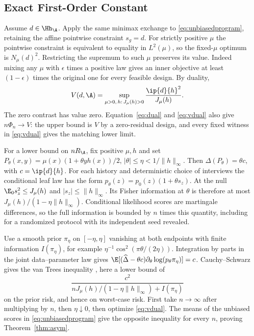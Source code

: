 \subsection{Exact First-Order Constant}
Assume $d\in\Hh_\A$. Apply the same minimax exchange to \eqref{eq:unbiasedprogram}, retaining the affine pointwise constraint $s_g=d$. For strictly positive $\mu$ the pointwise constraint is equivalent to equality in $L^2(\mu)$, so the fixed-$\mu$ optimum is $N_\mu(d)^2$. Restricting the supremum to such $\mu$ preserves its value. Indeed mixing any $\mu$ with $\epsilon$ times a positive law gives an inner objective at least $(1-\epsilon)$ times the original one for every feasible design. By duality,
\begin{equation}
 V(d,\A)=\sup_{\mu>0,\,h:\,J_\mu(h)>0}
                \frac{\ip{d}{h}^2}{J_\mu(h)}.\label{eq:vdual}
\end{equation}
The zero contrast has value zero. Equation~\eqref{eq:dual} and \eqref{eq:vdual} also give $n\Phi_n\to V$: the upper bound is $V$ by a zero-residual design, and every fixed witness in \eqref{eq:vdual} gives the matching lower limit.

For a lower bound on $nR_\A$, fix positive $\mu,h$ and set $P_\theta(x,y)=\mu(x)(1+\theta y h(x))/2$, $|\theta|\le\eta<1/\|h\|_\infty$. Then $\Delta(P_\theta)=\theta c$, with $c=\ip{d}{h}$. For each history and deterministic choice of interviews the conditional leaf law has the form $p_\theta(z)=p_0(z)(1+\theta s_z)$. At the null $\E_0s_z^2\le J_\mu(h)$ and $|s_z|\le\|h\|_\infty$. Its Fisher information at $\theta$ is therefore at most $J_\mu(h)/(1-\eta\|h\|_\infty)$. Conditional likelihood scores are martingale differences, so the full information is bounded by $n$ times this quantity, including for a randomized protocol with its independent seed revealed.

Use a smooth prior $\pi_\eta$ on $[-\eta,\eta]$ vanishing at both endpoints with finite information $I(\pi_\eta)$, for example $\eta^{-1}\cos^2(\pi \theta/(2\eta))$. Integration by parts in the joint data--parameter law gives $\E[(\widehat\Delta-\theta c)\partial_\theta\log(p_\theta\pi_\eta)]=c$. Cauchy--Schwarz gives the van Trees inequality \citep{gill1995}, here a lower bound of
\[
     \frac{c^2}{nJ_\mu(h)/(1-\eta\|h\|_\infty)+I(\pi_\eta)}
\]
on the prior risk, and hence on worst-case risk. First take $n\to\infty$ after multiplying by $n$, then $\eta\downarrow0$, then optimize \eqref{eq:vdual}. The means of the unbiased scores in \eqref{eq:unbiasedprogram} give the opposite inequality for every $n$, proving Theorem~\ref{thm:asym}.

